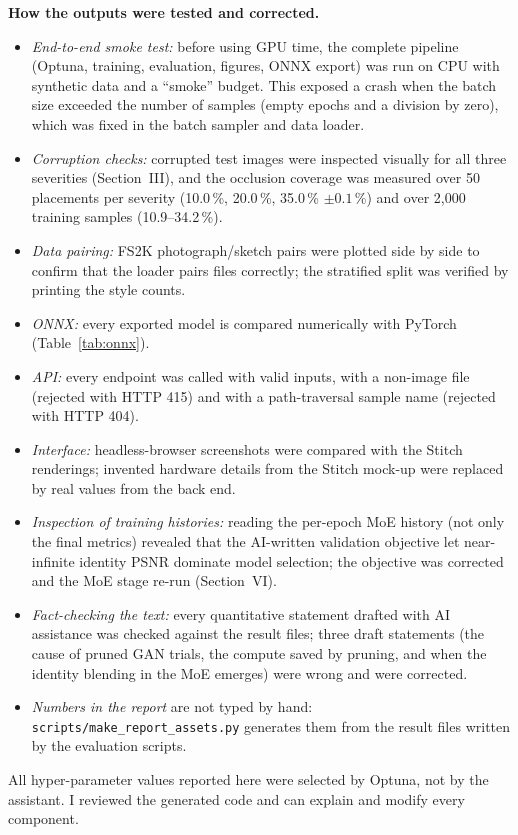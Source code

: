 \textbf{How the outputs were tested and corrected.}
\begin{itemize}
\item \emph{End-to-end smoke test:} before using GPU time, the complete pipeline (Optuna, training, evaluation, figures, ONNX export) was run on CPU with synthetic data and a ``smoke'' budget. This exposed a crash when the batch size exceeded the number of samples (empty epochs and a division by zero), which was fixed in the batch sampler and data loader.
\item \emph{Corruption checks:} corrupted test images were inspected visually for all three severities (Section~III), and the occlusion coverage was measured over 50 placements per severity (10.0\,\%, 20.0\,\%, 35.0\,\% $\pm0.1$\,\%) and over 2,000 training samples (10.9--34.2\,\%).
\item \emph{Data pairing:} FS2K photograph/sketch pairs were plotted side by side to confirm that the loader pairs files correctly; the stratified split was verified by printing the style counts.
\item \emph{ONNX:} every exported model is compared numerically with PyTorch (Table~\ref{tab:onnx}).
\item \emph{API:} every endpoint was called with valid inputs, with a non-image file (rejected with HTTP 415) and with a path-traversal sample name (rejected with HTTP 404).
\item \emph{Interface:} headless-browser screenshots were compared with the Stitch renderings; invented hardware details from the Stitch mock-up were replaced by real values from the back end.
\item \emph{Inspection of training histories:} reading the per-epoch MoE history (not only the final metrics) revealed that the AI-written validation objective let near-infinite identity PSNR dominate model selection; the objective was corrected and the MoE stage re-run (Section~VI).
\item \emph{Fact-checking the text:} every quantitative statement drafted with AI assistance was checked against the result files; three draft statements (the cause of pruned GAN trials, the compute saved by pruning, and when the identity blending in the MoE emerges) were wrong and were corrected.
\item \emph{Numbers in the report} are not typed by hand: \texttt{scripts/make\_report\_assets.py} generates them from the result files written by the evaluation scripts.
\end{itemize}
All hyper-parameter values reported here were selected by Optuna, not by the assistant. I reviewed the generated code and can explain and modify every component.
